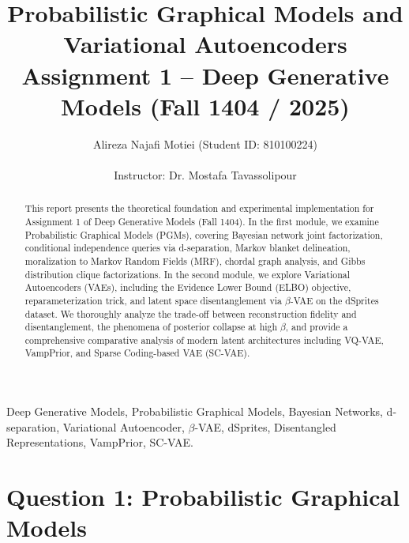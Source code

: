 \documentclass[10pt,journal,compsoc]{IEEEtran}
\begin{document}
\title{Probabilistic Graphical Models and Variational Autoencoders\\
\large Assignment 1 -- Deep Generative Models (Fall 1404 / 2025)}

\author{Alireza Najafi Motiei (Student ID: 810100224)\\
\\
Instructor: Dr. Mostafa Tavassolipour}


\maketitle

\begin{abstract}
This report presents the theoretical foundation and experimental implementation for Assignment 1 of Deep Generative Models (Fall 1404). In the first module, we examine Probabilistic Graphical Models (PGMs), covering Bayesian network joint factorization, conditional independence queries via d-separation, Markov blanket delineation, moralization to Markov Random Fields (MRF), chordal graph analysis, and Gibbs distribution clique factorizations. In the second module, we explore Variational Autoencoders (VAEs), including the Evidence Lower Bound (ELBO) objective, reparameterization trick, and latent space disentanglement via $\beta$-VAE on the dSprites dataset. We thoroughly analyze the trade-off between reconstruction fidelity and disentanglement, the phenomena of posterior collapse at high $\beta$, and provide a comprehensive comparative analysis of modern latent architectures including VQ-VAE, VampPrior, and Sparse Coding-based VAE (SC-VAE).
\end{abstract}

\begin{IEEEkeywords}
Deep Generative Models, Probabilistic Graphical Models, Bayesian Networks, d-separation, Variational Autoencoder, $\beta$-VAE, dSprites, Disentangled Representations, VampPrior, SC-VAE.
\end{IEEEkeywords}

\section{Question 1: Probabilistic Graphical Models}
\end{document}
